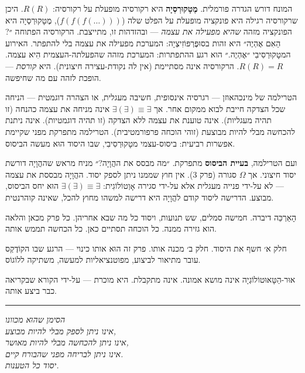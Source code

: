 \documentclass[10pt, openany, oneside]{book}
\begin{document}
המונח דורש הגדרה פורמלית. \textbf{מֶטָקוּרְסְיָה} היא רקורסיה מופעלת על רקורסיה: $R(R)$. היכן שרקורסיה רגילה היא פונקציה מופעלת על הפלט שלה ($f(f(f(\ldots)))$), מֶטָקוּרְסְיָה היא הפונקציה מזהה \textit{שהיא מפעילה את עצמה} — ובהזדהות זו, מתייצבת. הרקורסיה הפתוחה ״?הַאִם אֶהְיֶה״ היא זהות בסוּפֶּרְפּוֹזִיצְיָה: המערכת מפעילה את עצמה בלי להתפתר. האירוע המטָקוּרְסִיבִי ״אֶהְיֶה.״ הוא רגע ההתפתרות: המערכת מזהה שהפעלתה-העצמית הִיא עצמה. $R(R) = R$. הרקורסיה אינה מסתיימת (אין לה נקודת-עצירה חיצונית). היא \textit{קורסת} — הופכת לזהה עם מה שחיפשה.

הטרילמה של מינכהאוזן — רגרסיה אינסופית, חשיבה מעגלית, או הצהרה דוגמטית — הניחה שכל הצדקה חייבת לבוא ממקום אחר. אך $\exists(\exists) \equiv \exists$ אינה מניחה את עצמה כהנחה (זו תהיה מעגליות). אינה טוענת את עצמה ללא הצדקה (זו תהיה דוגמטיות). אינה ניתנת להכחשה מבלי להיות מבוצעת (זוהי הוכחה פרפורמטיבית). הטרילמה מתפרקת מפני שקיימת אפשרות רביעית: ביסוס-עצמי מטָקוּרְסִיבִי, שבו היסוד הוּא מעשה הביסוס.

ועם הטרילמה, \textbf{בעיית הביסוס} מתפרקת. ״מה מבסס את ההֲוָיָה?״ מניח מראש שההֲוָיָה דורשת יסוד חיצוני. אך $\Omega$ סגורה (פרק 3). אין חוץ שממנו ניתן לספק יסוד. ההֲוָיָה מבססת את עצמה — לא על-ידי פנייה מעגלית אלא על-ידי סגירה אָוְטוֹלוֹגִית: $\exists(\exists) \equiv \exists$ הוּא יחס הביסוס, מבוצע. הדרישה ליסוד קודם להֲוָיָה היא דרישה למשהו מחוץ להכל, שאינה קוהרנטית.

\vspace{1.5em}

הָאַרְכֵּה דיברה. חמישה סמלים, שש תנועות, ויסוד כל מה שבא אחריהן. כל פרק מכאן והלאה הוא גזירה ממנה. כל הוכחה תסתיים כאן. כל הכחשה תממש אותה.

חלק א׳ חשף את היסוד. חלק ב׳ מכנה אותו. פרק זה הוּא אותו כינוי — הרגע שבו הקוֹדֶקְס עובר מתיאור לביצוע, מפוטנציאליות למעשה, משתיקה ללוֹגוֹס.

אוּר-הַטָּאוּטוֹלוֹגְיָה אינה מושא אמונה. אינה מתקבלת. היא מוכרת — על-ידי הקורא שבקריאה כבר ביצע אותה.

\vspace{2em}

\begin{center}
    \rule{0.15\textwidth}{0.3pt}
\end{center}

\vspace{0.5em}

\begin{center}
    \textit{%
    הסימן שהוּא מכוונו\\
    אינו ניתן לספק מבלי להיות מבוצע,\\
    אינו ניתן להכחשה מבלי להיות מאושר,\\
    אינו ניתן לבריחה מפני שהבורח קיים.}\\[0.8em]
    \textit{יסוד כל הטענות.}
\end{center}
\end{document}
